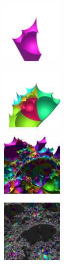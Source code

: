 \documentclass[dvipdfmx]{interact}
\theoremstyle{plain}%
\theoremstyle{definition}
\theoremstyle{remark}
\theoremstyle{problemstyle}
\begin{document}
\begin{figure}[h!tbp]
 \begin{minipage}[t]{0.19\textwidth}
  \centering
  \includegraphics[height=1.2in, keepaspectratio]{./img/constructFractal/terrainProcess/step1.png}
  \label{fig:terrainStep1}
 \end{minipage}
 \hspace*{\fill}
 \begin{minipage}[t]{0.19\textwidth}
  \centering
  \includegraphics[height=1.2in, keepaspectratio]{./img/constructFractal/terrainProcess/step2.png}
  \label{}
 \end{minipage}
 \hspace*{\fill}
 \begin{minipage}[t]{0.19\textwidth}
  \centering
  \includegraphics[height=1.2in, keepaspectratio]{./img/constructFractal/terrainProcess/step5.png}
  \label{}
 \end{minipage}
 \hspace*{\fill}
 \begin{minipage}[t]{0.19\textwidth}
  \centering
  \includegraphics[height=1.2in, keepaspectratio]{./img/constructFractal/terrainProcess/step10.jpg}

\end{minipage}
\end{figure}
\end{document}
